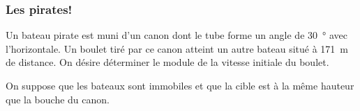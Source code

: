 \documentclass{beamer}
\begin{document}
\begin{frame}
  \frametitle{Les pirates!}

  Un bateau pirate est muni d'un canon dont le tube forme un angle de
  \SI{30}{\degree} avec l'horizontale. Un boulet tiré par ce canon atteint un
  autre bateau situé à \SI{171}{\meter} de distance.  On désire déterminer le
  module de la vitesse initiale du boulet.

  On suppose que les bateaux sont immobiles et que la cible est à la même
  hauteur que la bouche du canon.

\end{frame}
\end{document}
